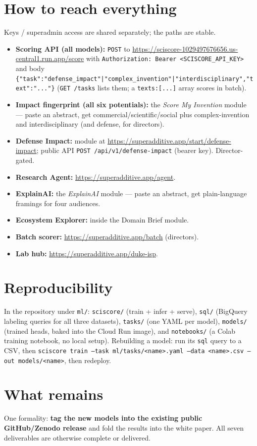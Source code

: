 \documentclass[11pt]{article}
\begin{document}
\section{How to reach everything}\label{sec:access}
Keys / superadmin access are shared separately; the paths are stable.
\begin{itemize}[leftmargin=1.4em, itemsep=1pt]
  \item \textbf{Scoring API (all models):} \texttt{POST} to
  \url{https://sciscore-1029497676656.us-central1.run.app/score} with
  \texttt{Authorization: Bearer <SCISCORE\_API\_KEY>} and body
  \texttt{\{"task":"defense\_impact"|"complex\_invention"|"interdisciplinary","text":"..."\}}
  (\texttt{GET /tasks} lists them; a \texttt{texts:[...]} array scores in batch).
  \item \textbf{Impact fingerprint (all six potentials):} the \emph{Score My
  Invention} module --- paste an abstract, get commercial/scientific/social plus
  complex-invention and interdisciplinary (and defense, for directors).
  \item \textbf{Defense Impact:} module at \url{https://superadditive.app/start/defense-impact};
  public API \texttt{POST /api/v1/defense-impact} (bearer key). Director-gated.
  \item \textbf{Research Agent:} \url{https://superadditive.app/agent}.
  \item \textbf{ExplainAI:} the \emph{ExplainAI} module --- paste an abstract, get plain-language framings for four audiences.
  \item \textbf{Ecosystem Explorer:} inside the Domain Brief module.
  \item \textbf{Batch scorer:} \url{https://superadditive.app/batch} (directors).
  \item \textbf{Lab hub:} \url{https://superadditive.app/duke-isp}.
\end{itemize}

\section{Reproducibility}\label{sec:repro}
In the repository under \texttt{ml/}:
\texttt{sciscore/} (train + infer + serve), \texttt{sql/} (BigQuery labeling
queries for all three datasets), \texttt{tasks/} (one YAML per model),
\texttt{models/} (trained heads, baked into the Cloud Run image), and
\texttt{notebooks/} (a Colab training notebook, no local setup). Rebuilding a model:
run its \texttt{sql} query to a CSV, then
\texttt{sciscore train --task ml/tasks/<name>.yaml --data <name>.csv --out models/<name>},
then redeploy.

\section*{What remains}
One formality: \textbf{tag the new models into the existing public GitHub/Zenodo
release} and fold the results into the white paper. All seven deliverables are
otherwise complete or delivered.
\end{document}
